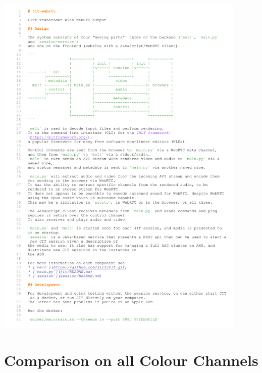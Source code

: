 \documentclass[../MasterThesis.tex]{subfiles}
\begin{document}
\includegraphics[page=2, width=0.9\textwidth]{BE.pdf}













\newpage
\section{Comparison on all Colour Channels} \label{appendix:comparisonRGB}


\setlength{\abovecaptionskip}{2pt} %
\setlength{\belowcaptionskip}{4pt} %
\end{document}

